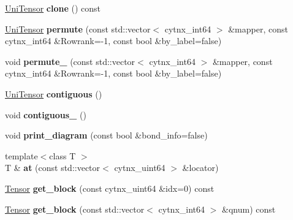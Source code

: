 \begin{DoxyCompactItemize}
\mbox{\label{classcytnx_1_1UniTensor_ae1125e6627eb2f5268d5c21944d31434}} 
\hyperlink{classcytnx_1_1UniTensor}{Uni\+Tensor} {\bfseries clone} () const
\item 
\mbox{\label{classcytnx_1_1UniTensor_a77ab3a44a6bfb1ab80de3d186b626d62}} 
\hyperlink{classcytnx_1_1UniTensor}{Uni\+Tensor} {\bfseries permute} (const std\+::vector$<$ cytnx\+\_\+int64 $>$ \&mapper, const cytnx\+\_\+int64 \&Rowrank=-\/1, const bool \&by\+\_\+label=false)
\item 
\mbox{\label{classcytnx_1_1UniTensor_a9fc950c25515e43fd2c6deecc1e66a99}} 
void {\bfseries permute\+\_\+} (const std\+::vector$<$ cytnx\+\_\+int64 $>$ \&mapper, const cytnx\+\_\+int64 \&Rowrank=-\/1, const bool \&by\+\_\+label=false)
\item 
\mbox{\label{classcytnx_1_1UniTensor_a450c62c231335103f723b96d0c08d18f}} 
\hyperlink{classcytnx_1_1UniTensor}{Uni\+Tensor} {\bfseries contiguous} ()
\item 
\mbox{\label{classcytnx_1_1UniTensor_a80a6e52a909c02c577ebeeb815f93ebf}} 
void {\bfseries contiguous\+\_\+} ()
\item 
\mbox{\label{classcytnx_1_1UniTensor_a685061555097873eb172381059fda92b}} 
void {\bfseries print\+\_\+diagram} (const bool \&bond\+\_\+info=false)
\item 
\mbox{\label{classcytnx_1_1UniTensor_a432b37f45cd8a87ceefd45eb2d8e6330}} 
{\footnotesize template$<$class T $>$ }\\T \& {\bfseries at} (const std\+::vector$<$ cytnx\+\_\+uint64 $>$ \&locator)
\item 
\mbox{\label{classcytnx_1_1UniTensor_a7d4df6dffeca0fd8eafdb9d766813f84}} 
\hyperlink{classcytnx_1_1Tensor}{Tensor} {\bfseries get\+\_\+block} (const cytnx\+\_\+uint64 \&idx=0) const
\item 
\mbox{\label{classcytnx_1_1UniTensor_a9d08b8f666a998f435ccc2ac96e6c7e5}} 
\hyperlink{classcytnx_1_1Tensor}{Tensor} {\bfseries get\+\_\+block} (const std\+::vector$<$ cytnx\+\_\+int64 $>$ \&qnum) const

\end{DoxyCompactItemize}
